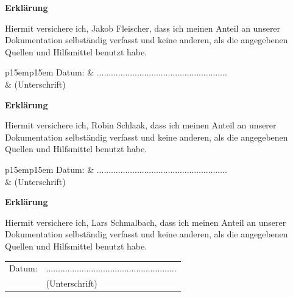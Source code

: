 \documentclass[12pt,a4paper,bibliography=totocnumbered,listof=totocnumbered]{scrartcl}
\begin{document}
\newpage
\thispagestyle{empty}
\begin{center}
	\vspace*{5em}
	\huge\textbf{Erklärung}\\
\end{center}
\vspace{2em}
Hiermit versichere ich, Jakob Fleischer, dass ich meinen Anteil an unserer Dokumentation selbständig verfasst und keine anderen, als die angegebenen Quellen und Hilfsmittel benutzt habe.

\vspace{4em}
\begin{minipage}{\linewidth}
	\begin{tabular}{p{15em}p{15em}}
		Datum: &  .......................................................\\
		& \centering (Unterschrift)\\
	\end{tabular}
\end{minipage}



\newpage
\thispagestyle{empty}
\begin{center}
	\vspace*{5em}
	\huge\textbf{Erklärung}\\
\end{center}
\vspace{2em}
Hiermit versichere ich, Robin Schlaak, dass ich meinen Anteil an unserer Dokumentation selbständig verfasst und keine anderen, als die angegebenen Quellen und Hilfsmittel benutzt habe.

\vspace{4em}
\begin{minipage}{\linewidth}
	\begin{tabular}{p{15em}p{15em}}
		Datum: &  .......................................................\\
		& \centering (Unterschrift)\\
	\end{tabular}
\end{minipage}

\newpage
\thispagestyle{empty}
\begin{center}
	\vspace*{5em}
	\huge\textbf{Erklärung}\\
\end{center}
\vspace{2em}
Hiermit versichere ich, Lars Schmalbach, dass ich meinen Anteil an unserer Dokumentation selbständig verfasst und keine anderen, als die angegebenen Quellen und Hilfsmittel benutzt habe.

\vspace{4em}
\begin{minipage}{\linewidth}
	\begin{tabular}{p{15em}p{15em}}
		Datum: &  .......................................................\\
		& \centering (Unterschrift)\\
	\end{tabular}
\end{minipage}
\end{document}
